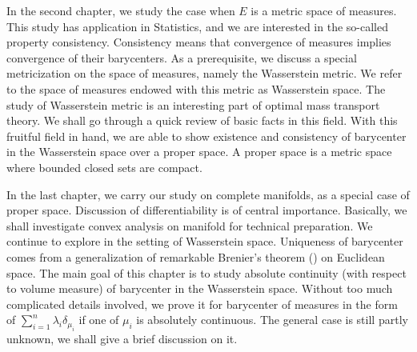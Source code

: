 In the second chapter, we study the case when $E$ is a metric space of measures.
This study has application in Statistics, and we are interested in the so-called property consistency.
Consistency means that convergence of measures implies convergence of their barycenters.
As a prerequisite, we discuss a special metricization on the space of measures,
namely the Wasserstein metric.
We refer to the space of measures endowed with this metric as Wasserstein space.
The study of Wasserstein metric is an interesting part of optimal mass transport theory.
We shall go through a quick review of basic facts in this field.
With this fruitful field in hand,
we are able to show existence and consistency of barycenter in the Wasserstein space over a proper space.
A proper space is a metric space where bounded closed sets are compact.

In the last chapter, we carry our study on complete manifolds,
as a special case of proper space.
Discussion of differentiability is of central importance.
Basically, we shall investigate convex analysis on manifold for technical preparation.
We continue to explore in the setting of Wasserstein space.
Uniqueness of barycenter comes from a generalization of
remarkable Brenier's theorem (\cite[Theorem 2.12]{villani2003topics}) on Euclidean space.
The main goal of this chapter is to study absolute continuity (with respect to volume measure) of barycenter in the Wasserstein space.
Without too much complicated details involved, we prove it for barycenter of measures in the form of
$\sum_{i=1}^{n} \lambda_i \delta_{\mu_i}$ if one of $\mu_i$ is absolutely continuous.
The general case is still partly unknown, we shall give a brief discussion on it.
